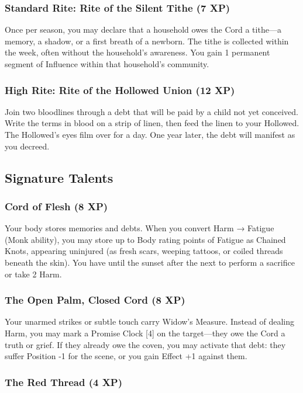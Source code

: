 \subsubsection{Standard Rite: Rite of the Silent Tithe (7 XP)}

Once per season, you may declare that a household owes the Cord a tithe—a memory, a shadow, or a first breath of a newborn. The tithe is collected within the week, often without the household's awareness. You gain 1 permanent segment of Influence within that household's community.

\subsubsection{High Rite: Rite of the Hollowed Union (12 XP)}

Join two bloodlines through a debt that will be paid by a child not yet conceived. Write the terms in blood on a strip of linen, then feed the linen to your Hollowed. The Hollowed's eyes film over for a day. One year later, the debt will manifest as you decreed.

\subsection{Signature Talents}

\subsubsection{Cord of Flesh (8 XP)}

Your body stores memories and debts. When you convert Harm → Fatigue (Monk ability), you may store up to Body rating points of Fatigue as Chained Knots, appearing uninjured (as fresh scars, weeping tattoos, or coiled threads beneath the skin). You have until the sunset after the next to perform a sacrifice or take 2 Harm.

\subsubsection{The Open Palm, Closed Cord (8 XP)}

Your unarmed strikes or subtle touch carry Widow's Measure. Instead of dealing Harm, you may mark a Promise Clock [4] on the target—they owe the Cord a truth or grief. If they already owe the coven, you may activate that debt: they suffer Position -1 for the scene, or you gain Effect +1 against them.

\subsubsection{The Red Thread (4 XP)}

